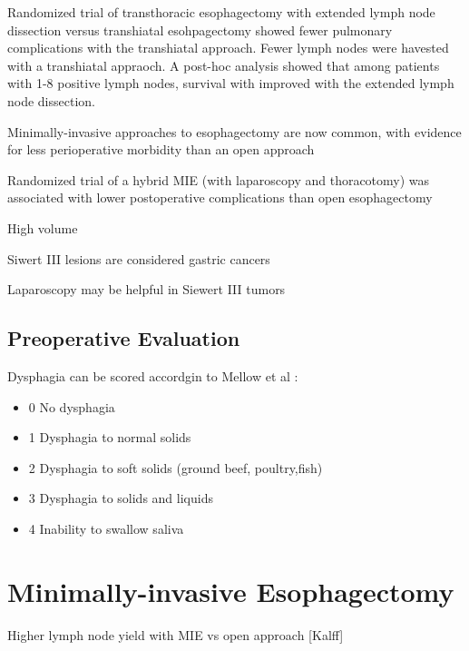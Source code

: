 \documentclass[
]{book}
\providecommand{\tightlist}{%
  \setlength{\itemsep}{0pt}\setlength{\parskip}{0pt}}
\begin{document}
Randomized trial of transthoracic esophagectomy with extended lymph node dissection versus transhiatal esohpagectomy showed fewer pulmonary complications with the transhiatal approach. \citep{hulscher1662} Fewer lymph nodes were havested with a transhiatal appraoch. A post-hoc analysis showed that among patients with 1-8 positive lymph nodes, survival with improved with the extended lymph node dissection.\citep{omloo992}

Minimally-invasive approaches to esophagectomy are now common, with evidence for less perioperative morbidity than an open approach \citep{biere1887} \citep{zhoue0132889}

Randomized trial of a hybrid MIE (with laparoscopy and thoracotomy) was associated with lower postoperative complications than open esophagectomy \citep{mariette152}

High volume \citep{birkmeyer2117} \citep{wouters1789}

Siwert III lesions are considered gastric cancers \citep{rusch444} \citep{siewert260}

Laparoscopy may be helpful in Siewert III tumors \citep{degraaf988}

\hypertarget{preoperative-evaluation}{%
\subsection{Preoperative Evaluation}\label{preoperative-evaluation}}

Dysphagia can be scored accordgin to Mellow et al \citep{mellow1443}:

\begin{itemize}
\tightlist
\item
  0 No dysphagia
\item
  1 Dysphagia to normal solids
\item
  2 Dysphagia to soft solids (ground beef, poultry,fish)
\item
  3 Dysphagia to solids and liquids
\item
  4 Inability to swallow saliva
\end{itemize}

\hypertarget{minimally-invasive-esophagectomy}{%
\section{Minimally-invasive Esophagectomy}\label{minimally-invasive-esophagectomy}}

Higher lymph node yield with MIE vs open approach {[}Kalff{]}
\end{document}
